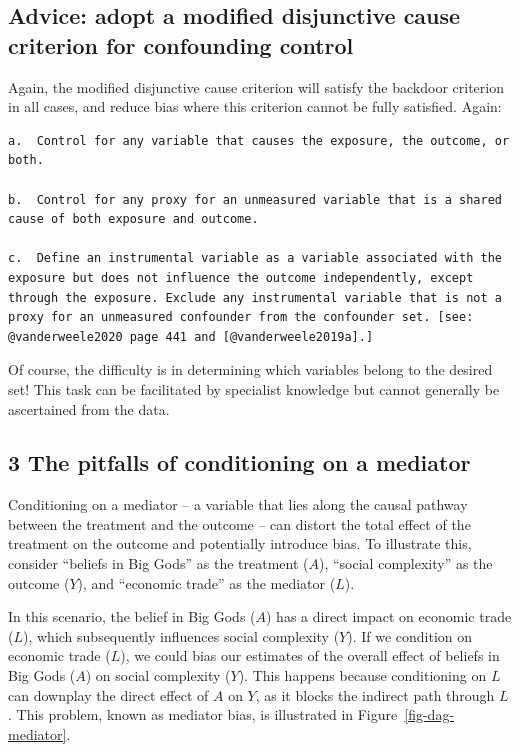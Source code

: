 \documentclass[
  singlecolumn]{report}
\begin{document}
\hypertarget{advice-adopt-a-modified-disjunctive-cause-criterion-for-confounding-control}{%
\subsection{Advice: adopt a modified disjunctive cause criterion for
confounding
control}\label{advice-adopt-a-modified-disjunctive-cause-criterion-for-confounding-control}}

Again, the modified disjunctive cause criterion will satisfy the
backdoor criterion in all cases, and reduce bias where this criterion
cannot be fully satisfied. Again:

\begin{verbatim}
a.  Control for any variable that causes the exposure, the outcome, or both.

b.  Control for any proxy for an unmeasured variable that is a shared cause of both exposure and outcome.

c.  Define an instrumental variable as a variable associated with the exposure but does not influence the outcome independently, except through the exposure. Exclude any instrumental variable that is not a proxy for an unmeasured confounder from the confounder set. [see: @vanderweele2020 page 441 and [@vanderweele2019a].]
\end{verbatim}

Of course, the difficulty is in determining which variables belong to
the desired set! This task can be facilitated by specialist knowledge
but cannot generally be ascertained from the data.

\hypertarget{the-pitfalls-of-conditioning-on-a-mediator}{%
\subsection{3 The pitfalls of conditioning on a
mediator}\label{the-pitfalls-of-conditioning-on-a-mediator}}

Conditioning on a mediator -- a variable that lies along the causal
pathway between the treatment and the outcome -- can distort the total
effect of the treatment on the outcome and potentially introduce bias.
To illustrate this, consider ``beliefs in Big Gods'' as the treatment
(\(A\)), ``social complexity'' as the outcome (\(Y\)), and ``economic
trade'' as the mediator (\(L\)).

In this scenario, the belief in Big Gods (\(A\)) has a direct impact on
economic trade (\(L\)), which subsequently influences social complexity
(\(Y\)). If we condition on economic trade (\(L\)), we could bias our
estimates of the overall effect of beliefs in Big Gods (\(A\)) on social
complexity (\(Y\)). This happens because conditioning on \(L\) can
downplay the direct effect of \(A\) on \(Y\), as it blocks the indirect
path through \(L\). This problem, known as mediator bias, is illustrated
in Figure~\ref{fig-dag-mediator}.
\end{document}
